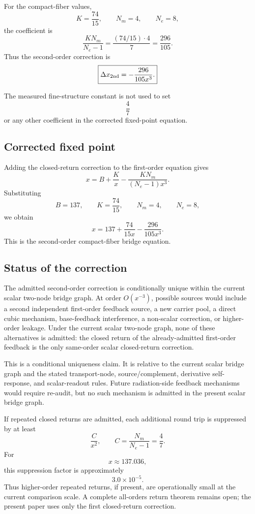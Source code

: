 For the compact-fiber values,
\[
K=\frac{74}{15},
\qquad
N_m=4,
\qquad
N_e=8,
\]
the coefficient is
\[
\frac{K N_m}{N_e-1}
=
\frac{(74/15)\cdot4}{7}
=
\frac{296}{105}.
\]
Thus the second-order correction is
\[
\boxed{
\Delta x_{\rm 2nd}
=
-\frac{296}{105x^3}.
}
\]

The measured fine-structure constant is not used to set
\[
\frac47
\]
or any other coefficient in the corrected fixed-point equation.

\subsection{Corrected fixed point}

Adding the closed-return correction to the first-order equation gives
\[
x
=
B+\frac{K}{x}
-
\frac{K N_m}{(N_e-1)x^3}.
\]
Substituting
\[
B=137,
\qquad
K=\frac{74}{15},
\qquad
N_m=4,
\qquad
N_e=8,
\]
we obtain
\[
x
=
137+\frac{74}{15x}
-
\frac{296}{105x^3}.
\]
This is the second-order compact-fiber bridge equation.

\subsection{Status of the correction}

The admitted second-order correction is conditionally unique within the
current scalar two-node bridge graph. At order \(O(x^{-3})\), possible
sources would include a second independent first-order feedback source,
a new carrier pool, a direct cubic mechanism, base-feedback interference,
a non-scalar correction, or higher-order leakage. Under the current scalar
two-node graph, none of these alternatives is admitted: the closed return
of the already-admitted first-order feedback is the only same-order scalar
closed-return correction.

This is a conditional uniqueness claim. It is relative to the current
scalar bridge graph and the stated transport-node, source/complement,
derivative self-response, and scalar-readout rules. Future radiation-side
feedback mechanisms would require re-audit, but no such mechanism is
admitted in the present scalar bridge graph.

If repeated closed returns are admitted, each additional round trip is
suppressed by at least
\[
\frac{C}{x^2},
\qquad
C=\frac{N_m}{N_e-1}=\frac47.
\]
For
\[
x\approx137.036,
\]
this suppression factor is approximately
\[
3.0\times10^{-5}.
\]
Thus higher-order repeated returns, if present, are operationally small
at the current comparison scale. A complete all-orders return theorem
remains open; the present paper uses only the first closed-return
correction.